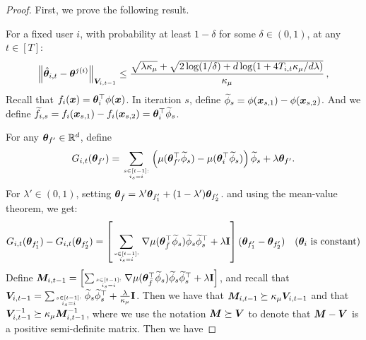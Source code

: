 \begin{proof}
    First, we prove the following result. 
    
    For a fixed user $i$, with probability at least $1-\delta$ for some $\delta\in(0,1)$, at any $t\in[T]$:
\begin{equation}
    \left\| \hat{\boldsymbol{\theta}}_{i,t}-\boldsymbol{\theta}^{j(i)} \right\|_{\boldsymbol{V}_{i,t-1}}\leq\frac{\sqrt{\lambda \kappa_\mu}+\sqrt{2\log(1/\delta)+d\log(1+4T_{i,t}\kappa_\mu/d\lambda)}}{\kappa_\mu}\label{V norm difference bound}\,,
\end{equation}
Recall that $f_i(\boldsymbol{x})=\boldsymbol{\theta}_i^\top\phi(\boldsymbol{x})$. In iteration $s$, define $\widetilde{\phi}_s = \phi(\boldsymbol{x}_{s,1}) - \phi(\boldsymbol{x}_{s,2})$.
And we define $\widetilde{f}_{i,s} = f_i(\boldsymbol{x}_{s,1}) - f_i(\boldsymbol{x}_{s,2}) =\boldsymbol{\theta}_i^{\top} \widetilde{\phi}_s$.

For any $\boldsymbol{\theta}_{f^\prime} \in\mathbb{R}^{d}$, define 
\[
G_{i,t}(\boldsymbol{\theta}_{f^\prime}) = \sum_{s\in[t-1]:\atop i_s=i}\left(\mu(\boldsymbol{\theta}_{f^\prime}^\top\widetilde{\phi}_s ) - \mu(\boldsymbol{\theta}_i^\top\widetilde{\phi}_s) \right) \widetilde{\phi}_s  + \lambda \boldsymbol{\theta}_{f'}.
\]
For $\lambda'\in(0, 1)$, setting $\boldsymbol{\theta}_{\bar{f}} = \lambda' \boldsymbol{\theta}_{f^\prime_1} + (1 - \lambda')\boldsymbol{\theta}_{f^\prime_2}$.
and using the mean-value theorem, we get:
\begin{align}
    \label{eqn:glb}
    G_{i,t}(\boldsymbol{\theta}_{f^\prime_1}) - G_{i,t}(\boldsymbol{\theta}_{f^\prime_2}) &= \left[\sum_{s\in[t-1]:\atop i_s=i} \nabla\mu(\boldsymbol{\theta}_{\bar{f}}^\top\widetilde{\phi}_s)\widetilde{\phi}_s \widetilde{\phi}_s^\top + \lambda \mathbf{I} \right](\boldsymbol{\theta}_{f^\prime_1} - \boldsymbol{\theta}_{f^\prime_2}) & \left( \boldsymbol{\theta}_i\text{ is constant} \right)  \nonumber \\
\end{align}
Define $\boldsymbol{M}_{i,t-1} = \left[\sum_{s\in[t-1]:\atop i_s=i}\nabla\mu(\boldsymbol{\theta}_{\bar{f}}^\top\widetilde{\phi}_s)\widetilde{\phi}_s \widetilde{\phi}_s^\top + \lambda \mathbf{I} \right]$, and recall that $\boldsymbol{V}_{i,t-1} = \sum_{s\in[t-1]:\atop i_s=i} \widetilde{\phi}_s \widetilde{\phi}_s^\top + \frac{\lambda}{\kappa_\mu} \mathbf{I}$.
Then we have that $\boldsymbol{M}_{i,t-1} \succeq \kappa_\mu \boldsymbol{V}_{i,t-1}$ and that $\boldsymbol{V}^{-1}_{i,t-1} \succeq \kappa_\mu \boldsymbol{M}^{-1}_{i,t-1}$, where we use the notation $\boldsymbol{M}\succeq \boldsymbol{V}$ to denote that $\boldsymbol{M}-\boldsymbol{V}$ is a positive semi-definite matrix. Then we have


\end{proof}
